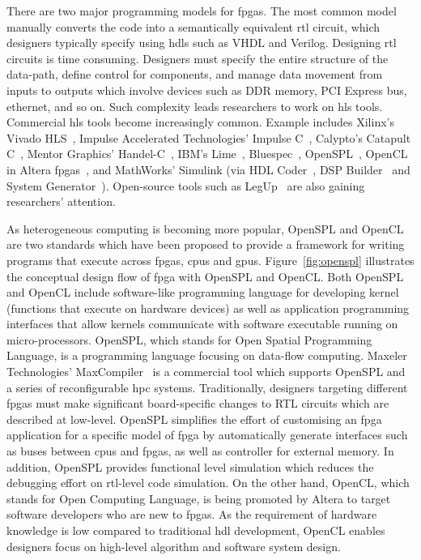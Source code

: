 There are two major programming models for \glspl{fpga}.
The most common model manually converts the code into a semantically equivalent \gls{rtl} circuit, which designers typically specify using \glspl{hdl} such as VHDL and Verilog.
Designing \gls{rtl} circuits is time consuming.
Designers must specify the entire structure of the data-path, define control for components, and manage data movement from inputs to outputs which involve devices such as DDR memory, PCI Express bus, ethernet, and so on.
Such complexity leads researchers to work on \gls{hls} tools.
Commercial \gls{hls} tools become increasingly common.
Example includes Xilinx's Vivado HLS~\cite{xilinxvivado}, Impulse Accelerated Technologies' Impulse C~\cite{impulsec}, Calypto's Catapult C~\cite{catapultc}, Mentor Graphics' Handel-C~\cite{handelc}, IBM's Lime~\cite{lime}, Bluespec~\cite{bluespec}, OpenSPL~\cite{openspl,maxcompiler}, OpenCL in Altera \glspl{fpga}~\cite{alteraopencl}, and MathWorks' Simulink (via HDL Coder~\cite{hdlcoder}, DSP Builder~\cite{alteradspbuilder} and System Generator~\cite{xilinxsysgen}).
Open-source tools such as LegUp~\cite{legup} are also gaining researchers' attention.

As heterogeneous computing is becoming more popular, OpenSPL and OpenCL are two standards which have been proposed to provide a framework for writing programs that execute across \glspl{fpga}, \glspl{cpu} and \glspl{gpu}.
Figure~\ref{fig:openspl} illustrates the conceptual design flow of \gls{fpga} with OpenSPL and OpenCL.
Both OpenSPL~\cite{openspl} and OpenCL include software-like programming language for developing kernel (functions that execute on hardware devices) as well as application programming interfaces that allow kernels communicate with software executable running on micro-processors.
OpenSPL, which stands for Open Spatial Programming Language, is a programming language focusing on data-flow computing.
Maxeler Technologies' MaxCompiler~\cite{maxcompiler} is a commercial tool which supports OpenSPL and a series of reconfigurable \gls{hpc} systems.
Traditionally, designers targeting different \glspl{fpga} must make significant board-specific changes to RTL circuits which are described at low-level.
OpenSPL simplifies the effort of customising an \gls{fpga} application for a specific model of \gls{fpga} by automatically generate interfaces such as buses between \glspl{cpu} and \glspl{fpga}, as well as controller for external memory.
In addition, OpenSPL provides functional level simulation which reduces the debugging effort on \gls{rtl}-level code simulation.
On the other hand, OpenCL, which stands for Open Computing Language, is being promoted by Altera to target software developers who are new to \glspl{fpga}.
As the requirement of hardware knowledge is low compared to traditional \gls{hdl} development, OpenCL enables designers focus on high-level algorithm and software system design.

